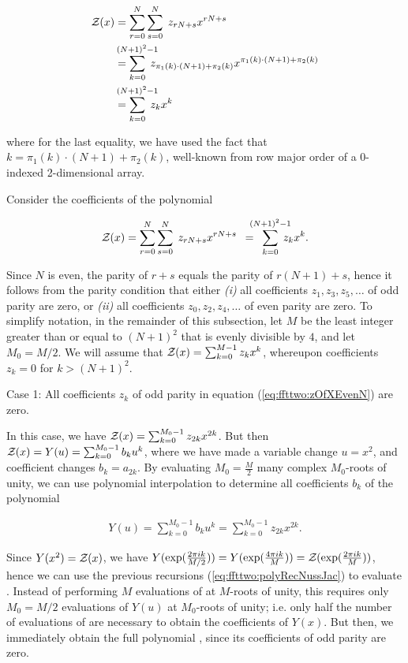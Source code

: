 \begin{align}
\label{eq:ffttwo:polyRecEvenN}
\begin{split}
\emZ{} &= \sum_{r=0}^{N} \sum_{s=0}^{N}\; z_{rN+s} x^{rN+s} \\
&=
\sum_{k=0}^{\mathclap{(N+1)^2-1}}\; z_{\pi_1(k)\cdot (N+1) + \pi_2(k)}
x^{\pi_1(k)\cdot (N+1) + \pi_2(k)} \\
&=
\sum_{k=0}^{\mathclap{(N+1)^2-1}}\; z_k x^k
\end{split}
\end{align}

where for the last equality, we have used the fact that
$k = \pi_1(k)\cdot (N+1)+\pi_2(k)$, well-known from
row major order of a 0-indexed 2-dimensional array.

Consider the coefficients of the polynomial

\begin{align}
\label{eq:ffttwo:zOfXEvenN}
\emZ{} = \sum_{r=0}^{N} \sum_{s=0}^{N}\; z_{rN+s} x^{rN+s}
\enspace=\enspace\sum_{k=0}^{\mathclap{(N+1)^2-1}}\; z_k x^k.
\end{align}

Since $N$ is even, the parity of $r+s$ equals the parity of
$r(N+1)+s$, hence  it follows from the parity condition that either
{\em (i)} all coefficients $z_1,z_3,z_5,\dots$ of odd parity are zero,
or {\em (ii)} all coefficients $z_0,z_2,z_4,\dots$ of even parity are zero.
To simplify notation, in the remainder of this subsection, let $M$ be
the least integer greater than or equal to $(N+1)^2$ that is evenly divisible
by $4$, and let $M_0=M/2$. We will assume that ${\mathcal Z}_{}(x) = \sum_{k=0}^{M-1}
z_k x^k$, whereupon coefficients $z_k=0$ for $k>(N+1)^2$.

\medskip
{\sc Case 1}: All coefficients $z_k$ of odd parity in
equation (\ref{eq:ffttwo:zOfXEvenN}) are zero.
\smallskip

In this case, we have
${\mathcal Z}_{}(x) = \sum_{k=0}^{M_0-1} z_{2k} x^{2k}$. But then
${\mathcal Z}_{}(x) = Y(u) = \sum_{k=0}^{M_0-1} b_k u^k$,
where we have made a variable change $u=x^2$, and coefficient changes
$b_k = a_{2k}$.
By evaluating $M_0=\frac{M}{2}$ many complex
$M_0$-roots of unity, we can
use polynomial interpolation to determine all coefficients $b_k$ of
the polynomial

\begin{align}
Y(u) = \sum_{k=0}^{M_0-1} b_k u^k = \sum_{k=0}^{M_0-1} z_{2k} x^{2k}.
\end{align}

Since $Y(x^2)={\mathcal Z}_{}(x)$, we have
$Y(\exp(\frac{2\pi i k}{M/2})) =
Y(\exp(\frac{4\pi i k}{M})) =
{\mathcal Z}_{}(\exp(\frac{2\pi i k}{M}))$, hence we can
use the previous recursions (\ref{eq:ffttwo:polyRecNussJac})
to evaluate .  Instead of
performing $M$ evaluations of \emZ{} at $M$-roots of unity,
this requires only $M_0=M/2$ evaluations of $Y(u)$ at
$M_0$-roots of unity; i.e. only half the number of
evaluations of \emZ{} are necessary to
obtain the coefficients of $Y(x)$. But then, we immediately obtain the
full polynomial \emZ{}, since its coefficients of odd parity are zero.

